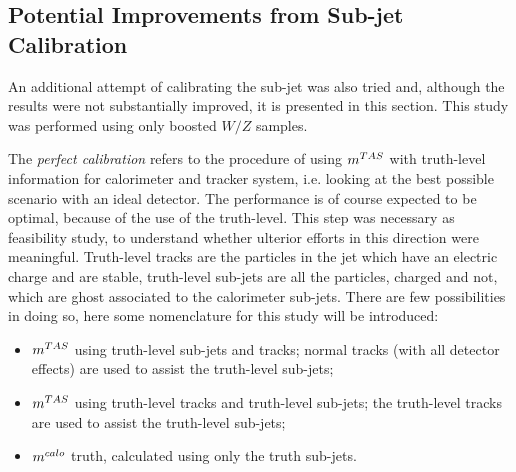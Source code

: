 \subsection{Potential Improvements from Sub-jet Calibration}

An additional attempt of calibrating the sub-jet was also tried and, although the results were not substantially improved, it is presented in this section. This study was performed using only boosted $W/Z$ samples.

The \textit{perfect calibration} refers to the procedure of using $m^{TAS}$ with truth-level information for calorimeter and tracker system, i.e. looking at the best possible scenario with an ideal detector. The performance is of course expected to be optimal, because of the use of the truth-level. This step was necessary as feasibility study, to understand whether ulterior efforts in this direction were meaningful.
Truth-level tracks are the particles in the jet which have an electric charge and are stable, truth-level sub-jets are all the particles, charged and not, which are ghost associated to the calorimeter sub-jets.
There are few possibilities in doing so, here some nomenclature for this study will be introduced:
\begin{itemize}
 \item $m^{TAS}$ using truth-level sub-jets and tracks; normal tracks (with all detector effects) are used to assist the truth-level sub-jets;
 \item $m^{TAS}$ using truth-level tracks and truth-level sub-jets; the truth-level tracks are used to assist the truth-level sub-jets;
 \item $m^{calo}$ truth, calculated using only the truth sub-jets.
\end{itemize}







